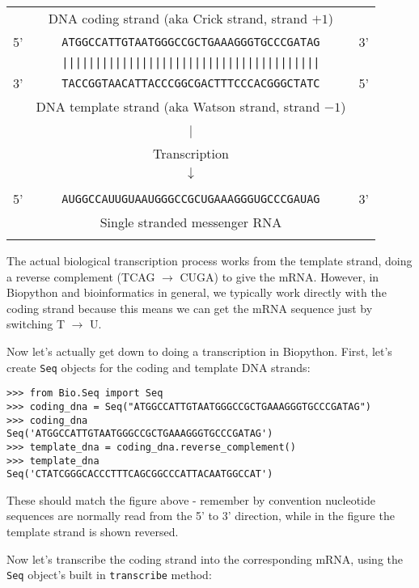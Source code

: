 \begin{tabular}{rcl}
\\
   & {\small DNA coding strand (aka Crick strand, strand $+1$)} & \\
5' & \texttt{ATGGCCATTGTAATGGGCCGCTGAAAGGGTGCCCGATAG} & 3' \\
   & \texttt{|||||||||||||||||||||||||||||||||||||||} & \\
3' & \texttt{TACCGGTAACATTACCCGGCGACTTTCCCACGGGCTATC} & 5' \\
   & {\small DNA template strand (aka Watson strand, strand $-1$)} & \\
\\
   & {\LARGE $|$} &\\
   & Transcription & \\
   & {\LARGE $\downarrow$} &\\
\\
5' & \texttt{AUGGCCAUUGUAAUGGGCCGCUGAAAGGGUGCCCGAUAG} & 3' \\
   & {\small Single stranded messenger RNA} & \\
\\
\end{tabular}

The actual biological transcription process works from the template strand, doing a reverse complement (TCAG $\rightarrow$ CUGA) to give the mRNA.  However, in Biopython and bioinformatics in general, we typically work directly with the coding strand because this means we can get the mRNA sequence just by switching T $\rightarrow$ U.

Now let's actually get down to doing a transcription in Biopython.  First, let's create \verb|Seq| objects for the coding and template DNA strands:

\begin{verbatim}
>>> from Bio.Seq import Seq
>>> coding_dna = Seq("ATGGCCATTGTAATGGGCCGCTGAAAGGGTGCCCGATAG")
>>> coding_dna
Seq('ATGGCCATTGTAATGGGCCGCTGAAAGGGTGCCCGATAG')
>>> template_dna = coding_dna.reverse_complement()
>>> template_dna
Seq('CTATCGGGCACCCTTTCAGCGGCCCATTACAATGGCCAT')
\end{verbatim}
\noindent These should match the figure above - remember by convention nucleotide sequences are normally read from the 5' to 3' direction, while in the figure the template strand is shown reversed.

Now let's transcribe the coding strand into the corresponding mRNA, using the \verb|Seq| object's built in \verb|transcribe| method:

